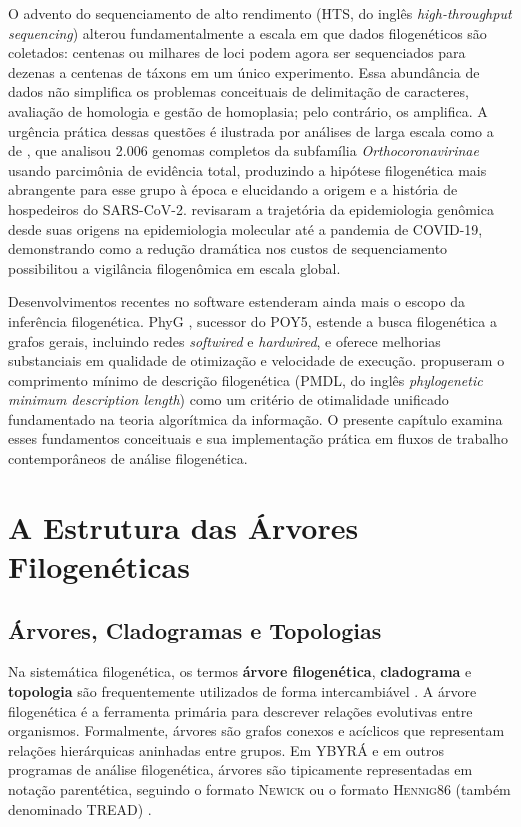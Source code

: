 O advento do sequenciamento de alto rendimento (HTS, do inglês \textit{high-throughput sequencing}) alterou fundamentalmente a escala em que dados filogenéticos são coletados: centenas ou milhares de loci podem agora ser sequenciados para dezenas a centenas de táxons em um único experimento. Essa abundância de dados não simplifica os problemas conceituais de delimitação de caracteres, avaliação de homologia e gestão de homoplasia; pelo contrário, os amplifica. A urgência prática dessas questões é ilustrada por análises de larga escala como a de \textcite{jacobmachado2021a}, que analisou 2.006 genomas completos da subfamília \textit{Orthocoronavirinae} usando parcimônia de evidência total, produzindo a hipótese filogenética mais abrangente para esse grupo à época e elucidando a origem e a história de hospedeiros do SARS-CoV-2. \textcite{jacobmachado2021b} revisaram a trajetória da epidemiologia genômica desde suas origens na epidemiologia molecular até a pandemia de COVID-19, demonstrando como a redução dramática nos custos de sequenciamento possibilitou a vigilância filogenômica em escala global.

Desenvolvimentos recentes no software estenderam ainda mais o escopo da inferência filogenética. PhyG \parencite{wheeleretal2024}, sucessor do POY5, estende a busca filogenética a grafos gerais, incluindo redes \textit{softwired} e \textit{hardwired}, e oferece melhorias substanciais em qualidade de otimização e velocidade de execução. \textcite{wheelervaron2025} propuseram o comprimento mínimo de descrição filogenética (PMDL, do inglês \textit{phylogenetic minimum description length}) como um critério de otimalidade unificado fundamentado na teoria algorítmica da informação. O presente capítulo examina esses fundamentos conceituais e sua implementação prática em fluxos de trabalho contemporâneos de análise filogenética.

\section{A Estrutura das Árvores Filogenéticas}

\subsection{Árvores, Cladogramas e Topologias}

Na sistemática filogenética, os termos \textbf{árvore filogenética}, \textbf{cladograma} e \textbf{topologia} são frequentemente utilizados de forma intercambiável \parencite{wheeler2012}. A árvore filogenética é a ferramenta primária para descrever relações evolutivas entre organismos. Formalmente, árvores são grafos conexos e acíclicos que representam relações hierárquicas aninhadas entre grupos. Em YBYRÁ e em outros programas de análise filogenética, árvores são tipicamente representadas em notação parentética, seguindo o formato \textsc{Newick} ou o formato \textsc{Hennig86} (também denominado \textsc{TREAD}) \parencite{machado2015}.

